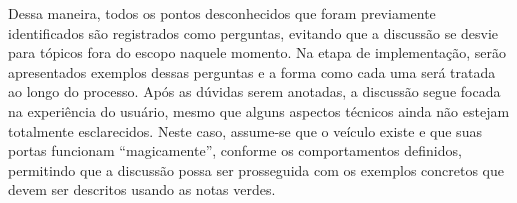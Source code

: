 Dessa maneira, todos os pontos desconhecidos que foram previamente identificados são registrados como perguntas, evitando que a discussão se desvie para tópicos 
fora do escopo naquele momento. Na etapa de implementação, serão apresentados exemplos dessas perguntas e a forma como cada uma será tratada ao longo do processo.
Após as dúvidas serem anotadas, a discussão segue focada na experiência do usuário, mesmo que alguns aspectos técnicos ainda não estejam totalmente esclarecidos. 
Neste caso, assume-se que o veículo existe e que suas portas funcionam “magicamente”, conforme os comportamentos definidos, permitindo que a discussão possa ser 
prosseguida com os exemplos concretos que devem ser descritos usando as notas verdes.






